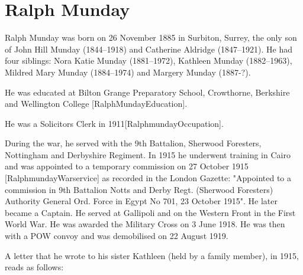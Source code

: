 \section{Ralph Munday}\label{Ralph_Munday}

Ralph Munday was born on 26 November 1885 in Surbiton, Surrey,  the only son of John Hill Munday (1844--1918) and Catherine Aldridge (1847--1921). He had four siblings: Nora Katie Munday (1881--1972), Kathleen Munday (1882--1963), Mildred Mary Munday (1884--1974) and Margery Munday (1887-?).

He was educated at Bilton Grange Preparatory School, Crowthorne, Berkshire and Wellington College [RalphMundayEducation].

He was a Solicitors Clerk in 1911[RalphmundayOccupation]. 

During the war, he served with the 9th Battalion, Sherwood Foresters, Nottingham and Derbyshire Regiment. In 1915 he underwent training in Cairo and was appointed to a temporary commission on 27 October 1915 [RalphmundayWarservice] as recorded in the London Gazette:  "Appointed to a commission in 9th Battalion Notts and Derby Regt. (Sherwood Foresters) Authority General Ord. Force in Egypt No 701, 23 October 1915".  He later became a Captain. He  served at Gallipoli and on the Western Front in the First World War. He was awarded the Military Cross on 3 June 1918. He was then with a POW convoy and was demobilised on 22 August 1919.

A letter that he wrote to his sister Kathleen (held by a family member), in 1915, reads as follows:

